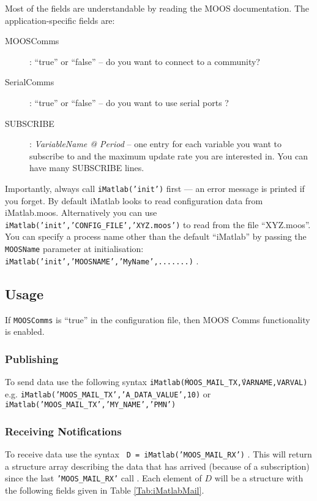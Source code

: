 \documentclass[a4paper,10pt]{article}
\newcommand{\Code}[1]{\texttt{#1} }
\newcommand{\code}[1]{\Code{#1} }
\begin{document}
Most of the fields are understandable by reading the MOOS
documentation. The application-specific fields are:
\begin{description}
\item [MOOSComms]: ``true'' or ``false'' -- do you want to connect to a
community?
%
\item [SerialComms]: ``true'' or ``false''  -- do you want to use serial
ports ?
%
\item [SUBSCRIBE]: {\it{VariableName @ Period}} -- one entry for each
variable you want to subscribe to and the maximum update rate you
are interested in. You can have many SUBSCRIBE lines.
\end{description}

Importantly, always call \code{iMatlab('init')} first --- an error
message is printed if you forget. By default iMatlab looks to read
configuration data from iMatlab.moos. Alternatively you can use
\code{iMatlab('init','CONFIG\_FILE','XYZ.moos')} to read from the
file ``XYZ.moos''.  You can specify a process name other than the
default ``iMatlab'' by passing the \code{MOOSName} parameter at
initialisation:
\code{iMatlab('init','MOOSNAME','MyName',.......)}.



\subsection{Usage}

If \code{MOOSComms} is ``true''  in the configuration file,  then
MOOS Comms functionality is enabled.

\subsubsection{Publishing}
To send data use the following syntax
\code{iMatlab(\'MOOS\_MAIL\_TX\',VARNAME,VARVAL)} e.g.
\newline \code{iMatlab('MOOS\_MAIL\_TX','A\_DATA\_VALUE',10)}
or\\
\code{iMatlab('MOOS\_MAIL\_TX','MY\_NAME','PMN')}\\

\subsubsection{Receiving Notifications}

To receive data use the syntax \code{ D =
iMatlab('MOOS\_MAIL\_RX')}.   This will return a structure array
describing the data that has arrived  (because of a subscription)
since the last  \code{'MOOS\_MAIL\_RX'} call . Each element of
$D$ will be a structure with the following fields given in Table
\ref{Tab:iMatlabMail}.
\end{document}
